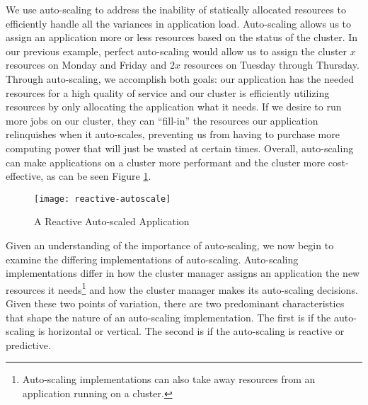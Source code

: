 We use auto-scaling to address the inability of statically allocated
resources to efficiently handle all the variances in application load.
Auto-scaling allows us to assign an application more or less resources based on
the status of the cluster. In our previous example, perfect auto-scaling
would allow us to assign the cluster $x$ resources on Monday and Friday and
$2x$ resources on Tuesday through Thursday. Through auto-scaling, we accomplish
both goals: our application has the needed resources for a high quality
of service and our cluster is efficiently utilizing resources by only
allocating the application what it needs. If we desire to run more jobs on our
cluster, they can ``fill-in'' the resources our application relinquishes when it
auto-scales, preventing us from having to purchase more computing power that
will just be wasted at certain times.
Overall, auto-scaling can make applications on a cluster more performant and
the cluster more cost-effective, as can be seen Figure
\ref{fig:reactive-autoscale}.

\begin{figure}[!h]
  \centerline{\texttt{[image: reactive-autoscale]}}
  \caption{A Reactive Auto-scaled Application}
  \label{fig:reactive-autoscale}
\end{figure}

Given an understanding of the importance of auto-scaling, we now begin to
examine the differing implementations of auto-scaling. Auto-scaling
implementations differ in how the cluster manager
assigns an application the new resources it
needs\footnote{Auto-scaling implementations can also take away resources from
an application running on a cluster.} and how the cluster manager makes its
auto-scaling decisions. Given these two points of
variation, there are two predominant characteristics that shape the nature of an auto-scaling
implementation. The first is if the auto-scaling is horizontal or vertical. The
second is if the auto-scaling is reactive or predictive.

